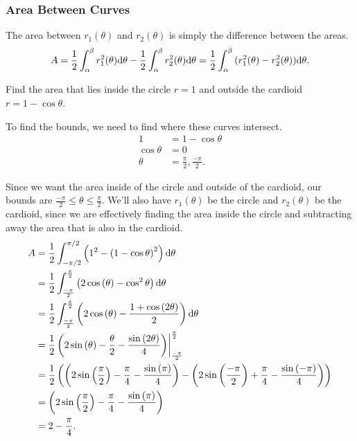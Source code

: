 \subsubsection{Area Between Curves}
The area between $r_1(\theta)$ and $r_2(\theta)$ is simply the difference between the areas.
\begin{equation*}
	A = \frac{1}{2}\int_{\alpha}^{\beta}{r_1^2(\theta)\mathrm{d} \theta} - \frac{1}{2}\int_{\alpha}^{\beta}{r_2^2(\theta)\mathrm{d} \theta} = \frac{1}{2}\int_{\alpha}^{\beta}{(r_1^2(\theta)-r_2^2(\theta))\mathrm{d} \theta}.
\end{equation*}

\begin{example}
	Find the area that lies inside the circle $r=1$ and outside the cardioid $r=1-\cos{\theta}$.
\end{example}
\begin{answer}
	To find the bounds, we need to find where these curves intersect.
	\begin{align*}
		1 &= 1-\cos{\theta} \\
		\cos{\theta} &= 0 \\
		\theta &= \frac{\pi}{2}, \frac{-\pi}{2}.
	\end{align*}
	
	Since we want the area inside of the circle and outside of the cardioid, our bounds are $\frac{-\pi}{2} \leq \theta \leq \frac{\pi}{2}$.
	We'll also have $r_1(\theta)$ be the circle and $r_2(\theta)$ be the cardioid, since we are effectively finding the area inside the circle and subtracting away the area that is also in the cardioid.
	\begin{align*}
		A &= \frac{1}{2}\int_{-\pi/2}^{\pi/2}{\left(1^2 - \left(1-\cos{\theta}\right)^2\right)\mathrm{d} \theta} \\
		&= \frac{1}{2}\int_{\frac{-\pi}{2}}^{\frac{\pi}{2}}\left(2\cos\left(\theta\right)-\cos^{2}\theta\right)\mathrm{d} \theta \\
		&= \frac{1}{2}\int_{\frac{-\pi}{2}}^{\frac{\pi}{2}}\left(2\cos\left(\theta\right)-\frac{1+\cos\left(2\theta\right)}{2}\right)\mathrm{d} \theta \\
		&= \frac{1}{2}\left(2\sin\left(\theta\right)-\frac{\theta}{2}-\frac{\sin\left(2\theta\right)}{4}\right) \biggr\rvert_{\frac{-\pi}{2}}^{\frac{\pi}{2}} \\
		&= \frac{1}{2}\left(\left(2\sin\left(\frac{\pi}{2}\right)-\frac{\pi}{4}-\frac{\sin\left(\pi\right)}{4}\right)-\left(2\sin\left(\frac{-\pi}{2}\right)+\frac{\pi}{4}-\frac{\sin\left(-\pi\right)}{4}\right)\right) \\
		&= \left(2\sin\left(\frac{\pi}{2}\right)-\frac{\pi}{4}-\frac{\sin\left(\pi\right)}{4}\right) \\
		&= 2-\frac{\pi}{4}.
	\end{align*}
\end{answer}

